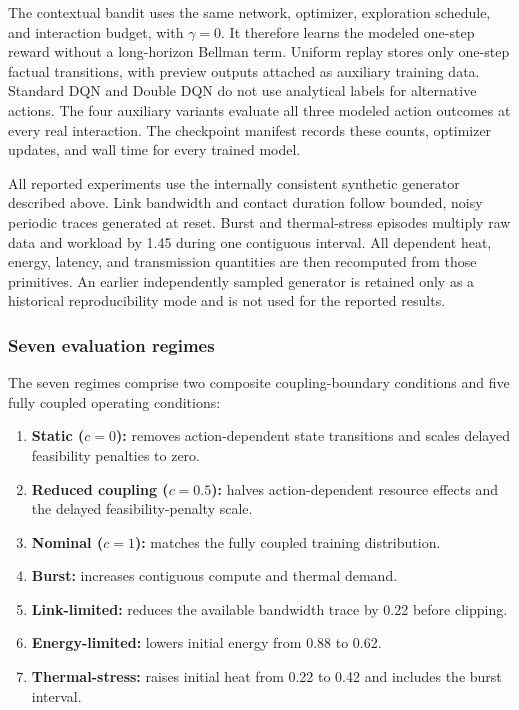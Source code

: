 \documentclass[remotesensing,article,submit,moreauthors]{Definitions/mdpi}
\begin{document}
The contextual bandit uses the same network, optimizer, exploration schedule, and interaction budget, with $\gamma=0$. It therefore learns the modeled one-step reward without a long-horizon Bellman term. Uniform replay stores only one-step factual transitions, with preview outputs attached as auxiliary training data. Standard DQN and Double DQN do not use analytical labels for alternative actions. The four auxiliary variants evaluate all three modeled action outcomes at every real interaction. The checkpoint manifest records these counts, optimizer updates, and wall time for every trained model.

All reported experiments use the internally consistent synthetic generator described above. Link bandwidth and contact duration follow bounded, noisy periodic traces generated at reset. Burst and thermal-stress episodes multiply raw data and workload by 1.45 during one contiguous interval. All dependent heat, energy, latency, and transmission quantities are then recomputed from those primitives. An earlier independently sampled generator is retained only as a historical reproducibility mode and is not used for the reported results.

\subsubsection{Seven evaluation regimes}

The seven regimes comprise two composite coupling-boundary conditions and five fully coupled operating conditions:

\begin{enumerate}[leftmargin=1.6em]
    \item \textbf{Static ($c=0$):} removes action-dependent state transitions and scales delayed feasibility penalties to zero.
    \item \textbf{Reduced coupling ($c=0.5$):} halves action-dependent resource effects and the delayed feasibility-penalty scale.
    \item \textbf{Nominal ($c=1$):} matches the fully coupled training distribution.
    \item \textbf{Burst:} increases contiguous compute and thermal demand.
    \item \textbf{Link-limited:} reduces the available bandwidth trace by 0.22 before clipping.
    \item \textbf{Energy-limited:} lowers initial energy from 0.88 to 0.62.
    \item \textbf{Thermal-stress:} raises initial heat from 0.22 to 0.42 and includes the burst interval.
\end{enumerate}
\end{document}
